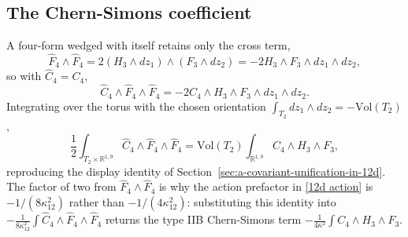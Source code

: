 \subsection*{The Chern-Simons coefficient}
A four-form wedged with itself retains only the cross term,
\begin{equation}
\widehat F_4\wedge\widehat F_4 = 2(H_3\wedge dz_1)\wedge(F_3\wedge dz_2) = -2H_3\wedge F_3\wedge dz_1\wedge dz_2 ,
\end{equation}
so with $\widehat C_4 = C_4$,
\begin{equation}
\widehat C_4\wedge\widehat F_4\wedge\widehat F_4 = -2C_4\wedge H_3\wedge F_3\wedge dz_1\wedge dz_2 .
\end{equation}
Integrating over the torus with the chosen orientation $\int_{T_2}dz_1\wedge dz_2 = -\mathrm{Vol}(T_2)$,
\begin{equation}
\frac12\int_{T_2\times\mathbb R^{1,9}}\widehat C_4\wedge\widehat F_4\wedge\widehat F_4
= \mathrm{Vol}(T_2)\int_{\mathbb R^{1,9}} C_4\wedge H_3\wedge F_3 ,
\end{equation}
reproducing the display identity of Section~\ref{sec:a-covariant-unification-in-12d}.
The factor of two from $\widehat F_4\wedge\widehat F_4$ is why the action prefactor in \eqref{12d action} is $-1/(8\kappa_{12}^2)$ rather than $-1/(4\kappa_{12}^2)$: substituting this identity into $-\tfrac{1}{8\kappa_{12}^2}\int\widehat C_4\wedge\widehat F_4\wedge\widehat F_4$ returns the type IIB Chern-Simons term $-\tfrac{1}{4\kappa^2}\int C_4\wedge H_3\wedge F_3$.

